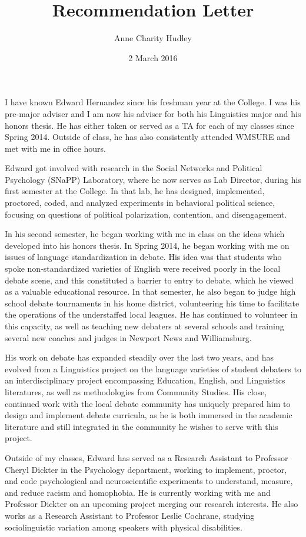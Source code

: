 \documentclass[doc,12pt]{apa6}
\begin{document}
\title{Recommendation Letter}
\author{Anne Charity Hudley}
\date{2 March 2016}
\maketitle

I have known Edward Hernandez since his freshman year at the College. I was his
pre-major adviser and I am now his adviser for both his Linguistics major and
his honors thesis. He has either taken or served as a TA for each of my classes
since Spring 2014. Outside of class, he has also consistently attended WMSURE
and met with me in office hours.

Edward got involved with research in the Social Networks and Political
Psychology (SNaPP) Laboratory, where he now serves as Lab Director, during his
first semester at the College. In that lab, he has designed, implemented,
proctored, coded, and analyzed experiments in behavioral political science,
focusing on questions of political polarization, contention, and disengagement.

In his second semester, he began working with me in class on the ideas which
developed into his honors thesis. In Spring 2014, he began working with me on
issues of language standardization in debate. His idea was that students who
spoke non-standardized varieties of English were received poorly in the local
debate scene, and this constituted a barrier to entry to debate, which he
viewed as a valuable educational resource. In that semester, he also began to
judge high school debate tournaments in his home district, volunteering his
time to facilitate the  operations of the understaffed local leagues. He has
continued to volunteer in this capacity, as well as teaching new debaters at
several schools and training several new coaches and judges in Newport News and
Williamsburg.

His work on debate has expanded steadily over the last two years, and has
evolved from a  Linguistics project on the language varieties of student
debaters to an interdisciplinary project encompassing Education, English, and
Linguistics literatures, as well as methodologies from Community Studies. His
close, continued work with the local debate community has uniquely prepared him
to design and implement debate curricula, as he is both immersed in the
academic literature and still integrated in the community he wishes to serve
with this project.

Outside of my classes, Edward has served as a Research Assistant to Professor
Cheryl Dickter in the Psychology department, working to implement, proctor, and
code psychological and neuroscientific experiments to understand, measure, and
reduce racism and homophobia. He is currently working with me and Professor
Dickter on an upcoming project merging our research interests. He also works as
a Research Assistant to Professor Leslie Cochrane, studying sociolinguistic
variation among speakers with physical disabilities.
\end{document}
